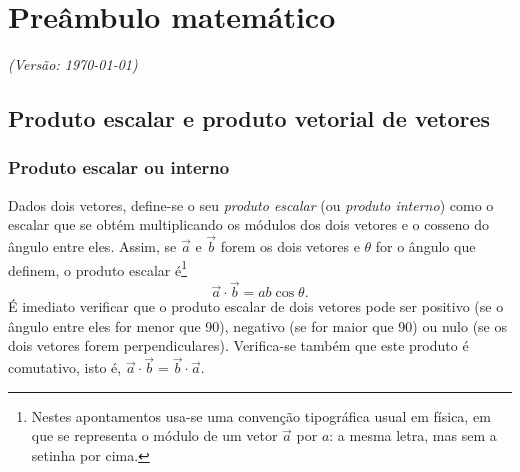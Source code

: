 \chapter{Preâmbulo matemático}
\textsl{{\sffamily(Versão: \today)}}

\section{Produto escalar e produto vetorial de vetores}
\subsection*{Produto escalar ou interno}
Dados dois vetores, define-se o seu \emph{produto escalar} (ou \emph{produto
interno}) como o escalar que se obtém multiplicando os módulos dos dois vetores
e o cosseno do ângulo entre eles. Assim, se $\vec a$ e $\vec b$ forem os dois
vetores e $\theta$ for o ângulo que definem, o produto escalar
é\footnote{Nestes apontamentos usa-se uma convenção tipográfica usual em física,
  em que se representa o módulo de um vetor $\vec a$ por $a$: a mesma letra, mas
sem a setinha por cima.}
\begin{equation}
  \vec a\cdot\vec b= ab\cos\theta.
\end{equation}
É imediato verificar que o produto escalar de dois vetores pode ser positivo (se
o ângulo entre eles for menor que 90\deg), negativo (se for maior que 90\deg) ou
nulo (se os dois vetores forem perpendiculares). Verifica-se também
que este produto é comutativo, isto é, $\vec a\cdot\vec b=\vec b\cdot\vec a$.

